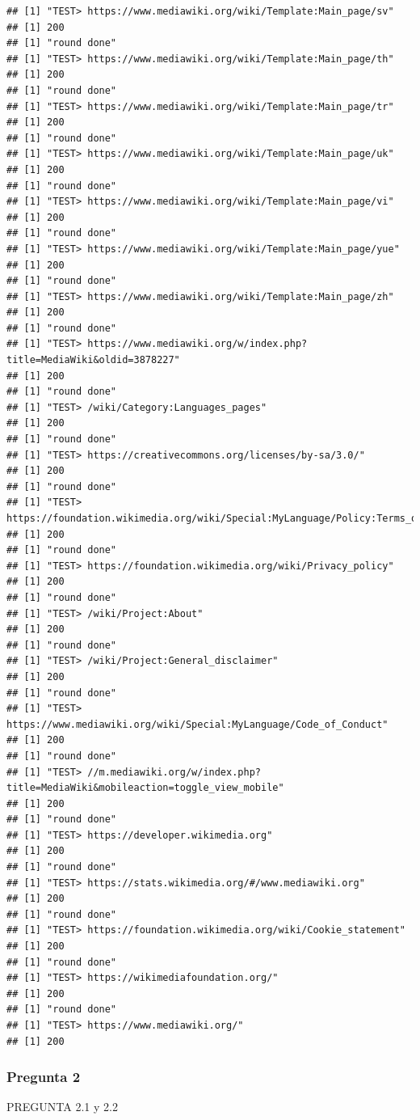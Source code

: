 \documentclass[
]{article}
\begin{document}
\begin{verbatim}
## [1] "TEST> https://www.mediawiki.org/wiki/Template:Main_page/sv"
## [1] 200
## [1] "round done"
## [1] "TEST> https://www.mediawiki.org/wiki/Template:Main_page/th"
## [1] 200
## [1] "round done"
## [1] "TEST> https://www.mediawiki.org/wiki/Template:Main_page/tr"
## [1] 200
## [1] "round done"
## [1] "TEST> https://www.mediawiki.org/wiki/Template:Main_page/uk"
## [1] 200
## [1] "round done"
## [1] "TEST> https://www.mediawiki.org/wiki/Template:Main_page/vi"
## [1] 200
## [1] "round done"
## [1] "TEST> https://www.mediawiki.org/wiki/Template:Main_page/yue"
## [1] 200
## [1] "round done"
## [1] "TEST> https://www.mediawiki.org/wiki/Template:Main_page/zh"
## [1] 200
## [1] "round done"
## [1] "TEST> https://www.mediawiki.org/w/index.php?title=MediaWiki&oldid=3878227"
## [1] 200
## [1] "round done"
## [1] "TEST> /wiki/Category:Languages_pages"
## [1] 200
## [1] "round done"
## [1] "TEST> https://creativecommons.org/licenses/by-sa/3.0/"
## [1] 200
## [1] "round done"
## [1] "TEST> https://foundation.wikimedia.org/wiki/Special:MyLanguage/Policy:Terms_of_Use"
## [1] 200
## [1] "round done"
## [1] "TEST> https://foundation.wikimedia.org/wiki/Privacy_policy"
## [1] 200
## [1] "round done"
## [1] "TEST> /wiki/Project:About"
## [1] 200
## [1] "round done"
## [1] "TEST> /wiki/Project:General_disclaimer"
## [1] 200
## [1] "round done"
## [1] "TEST> https://www.mediawiki.org/wiki/Special:MyLanguage/Code_of_Conduct"
## [1] 200
## [1] "round done"
## [1] "TEST> //m.mediawiki.org/w/index.php?title=MediaWiki&mobileaction=toggle_view_mobile"
## [1] 200
## [1] "round done"
## [1] "TEST> https://developer.wikimedia.org"
## [1] 200
## [1] "round done"
## [1] "TEST> https://stats.wikimedia.org/#/www.mediawiki.org"
## [1] 200
## [1] "round done"
## [1] "TEST> https://foundation.wikimedia.org/wiki/Cookie_statement"
## [1] 200
## [1] "round done"
## [1] "TEST> https://wikimediafoundation.org/"
## [1] 200
## [1] "round done"
## [1] "TEST> https://www.mediawiki.org/"
## [1] 200
\end{verbatim}

\hypertarget{pregunta-2}{%
\subsubsection{Pregunta 2}\label{pregunta-2}}

PREGUNTA 2.1 y 2.2
\end{document}
